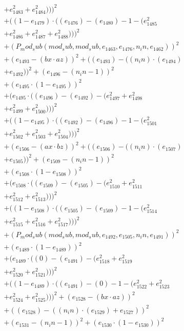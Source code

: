 \documentclass[10pt, a4paper]{article}
\begin{document}
\begin{align*}
& + e_{1483}^{2} + e_{1484}^{2})))^{2} \\
& + ((1 - e_{1479})  \cdot  ((e_{1476}) - (e_{1480}) - 1 - (e_{1485}^{2} \\
& + e_{1486}^{2} + e_{1487}^{2} + e_{1488}^{2})))^{2} \\
& + (P_mod_sub(mod_sub, mod_sub, e_{1463}, e_{1476}, n_in, e_{1462}))^{2} \\
& + (e_{1493} - (bx  \cdot  az))^{2} + ((e_{1493}) - ((n_in)  \cdot  (e_{1494}) \\
& + e_{1492}))^{2} + (e_{1496} - (n_in - 1))^{2} \\
& + (e_{1495}  \cdot  (1 - e_{1495}))^{2} \\
& + (e_{1495}  \cdot  ((e_{1496}) - (e_{1492}) - (e_{1497}^{2} + e_{1498}^{2} \\
& + e_{1499}^{2} + e_{1500}^{2})))^{2} \\
& + ((1 - e_{1495})  \cdot  ((e_{1492}) - (e_{1496}) - 1 - (e_{1501}^{2} \\
& + e_{1502}^{2} + e_{1503}^{2} + e_{1504}^{2})))^{2} \\
& + (e_{1506} - (ax  \cdot  bz))^{2} + ((e_{1506}) - ((n_in)  \cdot  (e_{1507}) \\
& + e_{1505}))^{2} + (e_{1509} - (n_in - 1))^{2} \\
& + (e_{1508}  \cdot  (1 - e_{1508}))^{2} \\
& + (e_{1508}  \cdot  ((e_{1509}) - (e_{1505}) - (e_{1510}^{2} + e_{1511}^{2} \\
& + e_{1512}^{2} + e_{1513}^{2})))^{2} \\
& + ((1 - e_{1508})  \cdot  ((e_{1505}) - (e_{1509}) - 1 - (e_{1514}^{2} \\
& + e_{1515}^{2} + e_{1516}^{2} + e_{1517}^{2})))^{2} \\
& + (P_mod_sub(mod_sub, mod_sub, e_{1492}, e_{1505}, n_in, e_{1491}))^{2} \\
& + (e_{1489}  \cdot  (1 - e_{1489}))^{2} \\
& + (e_{1489}  \cdot  ((0) - (e_{1491}) - (e_{1518}^{2} + e_{1519}^{2} \\
& + e_{1520}^{2} + e_{1521}^{2})))^{2} \\
& + ((1 - e_{1489})  \cdot  ((e_{1491}) - (0) - 1 - (e_{1522}^{2} + e_{1523}^{2} \\
& + e_{1524}^{2} + e_{1525}^{2})))^{2} + (e_{1528} - (bx  \cdot  az))^{2} \\
& + ((e_{1528}) - ((n_in)  \cdot  (e_{1529}) + e_{1527}))^{2} \\
& + (e_{1531} - (n_in - 1))^{2} + (e_{1530}  \cdot  (1 - e_{1530}))^{2} \\

\end{align*}
\end{document}
